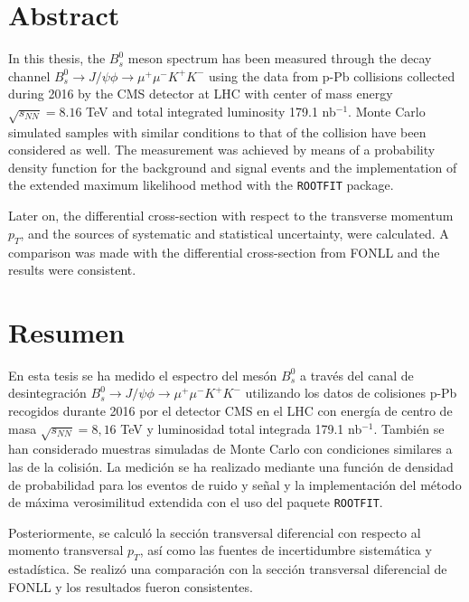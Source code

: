 \chapter*{Abstract}
\label{chap:Abstract}
In this thesis, the $B^0_s$ meson spectrum has been measured through the decay channel $B^0_s \to J/\psi \phi \to \mu^{+}\mu^{-} K^{+}K^{-}$ using the data from p-Pb collisions collected during 2016 by the CMS detector at LHC with center of mass energy $\sqrt{s_{NN}} = 8.16$ TeV and total integrated luminosity 179.1 nb$^{-1}$. Monte Carlo simulated samples with similar conditions to that of the collision have been considered as well. The measurement was achieved by means of a probability density function for the background and signal events and the implementation of the extended maximum likelihood method with the \verb|ROOTFIT| package. 

Later on, the differential cross-section with respect to the transverse momentum $p_T$, and the sources of systematic and statistical uncertainty, were calculated. A comparison was made with the differential cross-section from FONLL and the results were consistent. 
\cleardoublepage

\chapter*{Resumen}
\label{chap:Resumen}
En esta tesis se ha medido el espectro del mesón $B^0_s$ a través del canal de desintegración $B^0_s \to J/\psi \phi \to \mu^{+}\mu^{-} K^{+}K^{-}$ utilizando los datos de colisiones p-Pb recogidos durante 2016 por el detector CMS en el LHC con energía de centro de masa $\sqrt{s_{NN}} = 8,16$ TeV y luminosidad total integrada 179.1 nb$^{-1}$. También se han considerado muestras simuladas de Monte Carlo con condiciones similares a las de la colisión. La medición se ha realizado mediante una función de densidad de probabilidad para los eventos de ruido y señal y la implementación del método de máxima verosimilitud extendida con el uso del paquete \verb|ROOTFIT|. 

Posteriormente, se calculó la sección transversal diferencial con respecto al momento transversal $p_T$, así como las fuentes de incertidumbre sistemática y estadística. Se realizó una comparación con la sección transversal diferencial de FONLL y los resultados fueron consistentes. 

